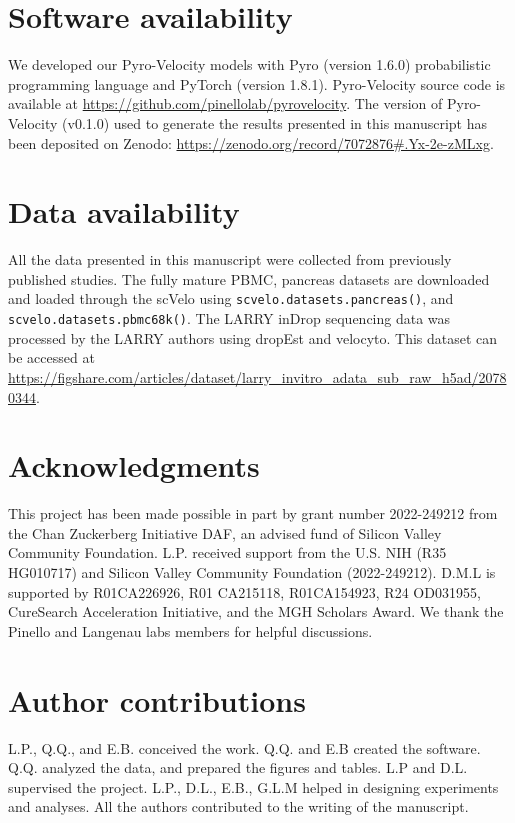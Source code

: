 \documentclass[
  sn-mathphys-num,
  lineno,
  twocolumn]{sn-jnl}
\begin{document}
\section{Software availability}\label{software-availability}

We developed our Pyro-Velocity models with Pyro (version 1.6.0)
probabilistic programming language and PyTorch (version 1.8.1).
Pyro-Velocity source code is available at
\url{https://github.com/pinellolab/pyrovelocity}. The version of
Pyro-Velocity (v0.1.0) used to generate the results presented in this
manuscript has been deposited on Zenodo:
\url{https://zenodo.org/record/7072876\#.Yx-2e-zMLxg}.

\section{Data availability}\label{data-availability}

All the data presented in this manuscript were collected from previously
published studies. The fully mature PBMC, pancreas datasets are
downloaded and loaded through the scVelo using
\texttt{scvelo.datasets.pancreas()}, and
\texttt{scvelo.datasets.pbmc68k()}. The LARRY inDrop sequencing data was
processed by the LARRY authors using dropEst \citep{Petukhov2018-nr} and
velocyto. This dataset can be accessed at
\url{https://figshare.com/articles/dataset/larry_invitro_adata_sub_raw_h5ad/20780344}.

\section{Acknowledgments}\label{acknowledgments}

This project has been made possible in part by grant number 2022-249212
from the Chan Zuckerberg Initiative DAF, an advised fund of Silicon
Valley Community Foundation. L.P. received support from the U.S. NIH
(R35 HG010717) and Silicon Valley Community Foundation (2022-249212).
D.M.L is supported by R01CA226926, R01 CA215118, R01CA154923, R24
OD031955, CureSearch Acceleration Initiative, and the MGH Scholars
Award. We thank the Pinello and Langenau labs members for helpful
discussions.

\section{Author contributions}\label{author-contributions}

L.P., Q.Q., and E.B. conceived the work. Q.Q. and E.B created the
software. Q.Q. analyzed the data, and prepared the figures and tables.
L.P and D.L. supervised the project. L.P., D.L., E.B., G.L.M helped in
designing experiments and analyses. All the authors contributed to the
writing of the manuscript.
\end{document}
